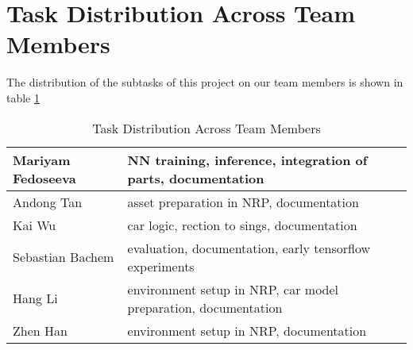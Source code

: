\section{Task Distribution Across Team Members}

The distribution of the subtasks of this project on our team members is shown in table \ref{tab:task_distrubution}

\begin{table}[htpb]
    \caption[Task Distribution Across Team Members]{Task Distribution Across Team Members}
    \label{tab:task_distrubution}
    \centering
    \begin{tabular}{|l|l|}
    \hline
    Mariyam Fedoseeva   & NN training, inference, integration of parts, documentation \\
    \hline
    Andong Tan          & asset preparation in NRP, documentation \\
    \hline
    Kai Wu              & car logic, rection to sings, documentation \\
    \hline
    Sebastian Bachem    & evaluation, documentation, early tensorflow experiments \\
    \hline
    Hang Li             & environment setup in NRP, car model preparation, documentation \\
    \hline
    Zhen Han            & environment setup in NRP, documentation\\
    \hline
    \end{tabular}
\end{table}
